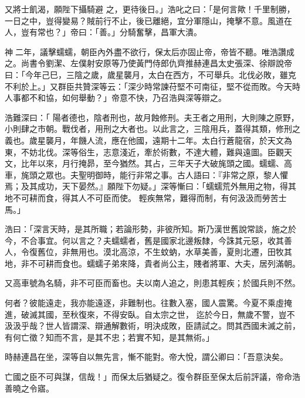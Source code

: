 \begin{pinyinscope}
 又將士飢渴，願陛下攝騎避
 之，更待後日。」浩叱之曰：「是何言歟！千里制勝，一日之中，豈得變易？賊前行不止，後已離絕，宜分軍隱山，掩擊不意。風道在人，豈有常也？」帝曰：「善。」分騎奮擊，昌軍大潰。



 神二年，議擊蠕蠕，朝臣內外盡不欲行，保太后亦固止帝，帝皆不聽。唯浩讚成之。尚書令劉潔、左僕射安原等乃使黃門侍郎仇齊推赫連昌太史張深、徐辯說帝曰：「今年己巳，三陰之歲，歲星襲月，太白在西方，不可舉兵。北伐必敗，雖克不利於上。」又群臣共贊深等云：「深少時常諫苻堅不可南征，堅不從而敗。今天時人事都不和協，如何舉動？」帝意不快，乃召浩與深等辯之。



 浩難深曰：「
 陽者德也，陰者刑也，故月蝕修刑。夫王者之用刑，大則陳之原野，小則肆之市朝。戰伐者，用刑之大者也。以此言之，三陰用兵，蓋得其類，修刑之義也。歲星襲月，年饑人流，應在他國，遠期十二年。太白行蒼龍宿，於天文為東，不妨北伐。深等俗生，志意淺近，牽於術數，不達大體，難與遠圖。臣觀天文，比年以來，月行掩昴，至今猶然。其占，三年天子大破旄頭之國。蠕蠕、高車，旄頭之眾也。夫聖明御時，能行非常之事。古人語曰：『非常之原，黎人懼焉；及其成功，天下晏然。』願陛下勿疑。」深等慚曰：「蠕蠕荒外無用之物，得其地不可耕而食，得其人不可臣而使。
 輕疾無常，難得而制，有何汲汲而勞苦士馬。」



 浩曰：「深言天時，是其所職；若論形勢，非彼所知。斯乃漢世舊說常談，施之於今，不合事宜。何以言之？夫蠕蠕者，舊是國家北邊叛隸，今誅其元惡，收其善人，令復舊位，非無用也。漠北高涼，不生蚊蚋，水草美善，夏則北遷，田牧其地，非不可耕而食也。蠕蠕子弟來降，貴者尚公主，賤者將軍、大夫，居列滿朝。



 又高車號為名騎，非不可臣而畜也。夫以南人追之，則患其輕疾；於國兵則不然。



 何者？彼能遠走，我亦能遠逐，非難制也。往數入塞，國人震驚。今夏不乘虛掩進，破滅其國，至秋復來，不得安臥。自太宗之世，
 迄於今日，無歲不警，豈不汲汲乎哉？世人皆謂深、辯通解數術，明決成敗，臣請試之。問其西國未滅之前，有何亡徵？知而不言，是其不忠；若實不知，是其無術。」



 時赫連昌在坐，深等自以無先言，慚不能對。帝大悅，謂公卿曰：「吾意決矣。



 亡國之臣不可與謀，信哉！」而保太后猶疑之。復令群臣至保太后前評議，帝命浩善曉之令寤。




\end{pinyinscope}
